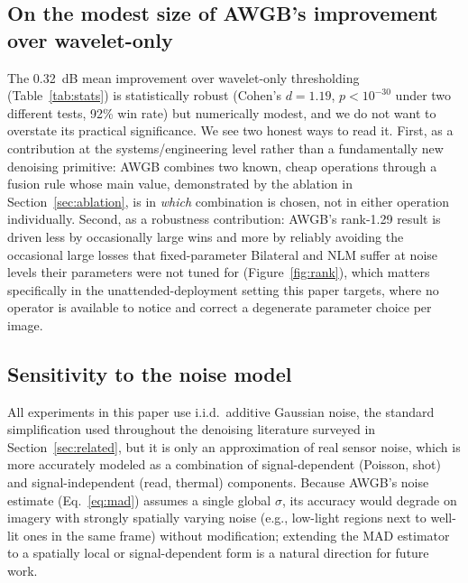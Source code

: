 \documentclass[final,3p,times,twocolumn,nopreprintline]{elsarticle}
\begin{document}
\subsection{On the modest size of AWGB's improvement over wavelet-only}
The 0.32~dB mean improvement over wavelet-only thresholding (Table~\ref{tab:stats}) is statistically robust (Cohen's $d=1.19$, $p<10^{-30}$ under two different tests, 92\% win rate) but numerically modest, and we do not want to overstate its practical significance. We see two honest ways to read it. First, as a contribution at the systems/engineering level rather than a fundamentally new denoising primitive: AWGB combines two known, cheap operations through a fusion rule whose main value, demonstrated by the ablation in Section~\ref{sec:ablation}, is in \emph{which} combination is chosen, not in either operation individually. Second, as a robustness contribution: AWGB's rank-1.29 result is driven less by occasionally large wins and more by reliably avoiding the occasional large losses that fixed-parameter Bilateral and NLM suffer at noise levels their parameters were not tuned for (Figure~\ref{fig:rank}), which matters specifically in the unattended-deployment setting this paper targets, where no operator is available to notice and correct a degenerate parameter choice per image.

\subsection{Sensitivity to the noise model}
All experiments in this paper use i.i.d.\ additive Gaussian noise, the standard simplification used throughout the denoising literature surveyed in Section~\ref{sec:related}, but it is only an approximation of real sensor noise, which is more accurately modeled as a combination of signal-dependent (Poisson, shot) and signal-independent (read, thermal) components. Because AWGB's noise estimate (Eq.~\eqref{eq:mad}) assumes a single global $\sigma$, its accuracy would degrade on imagery with strongly spatially varying noise (e.g., low-light regions next to well-lit ones in the same frame) without modification; extending the MAD estimator to a spatially local or signal-dependent form is a natural direction for future work.
\end{document}
